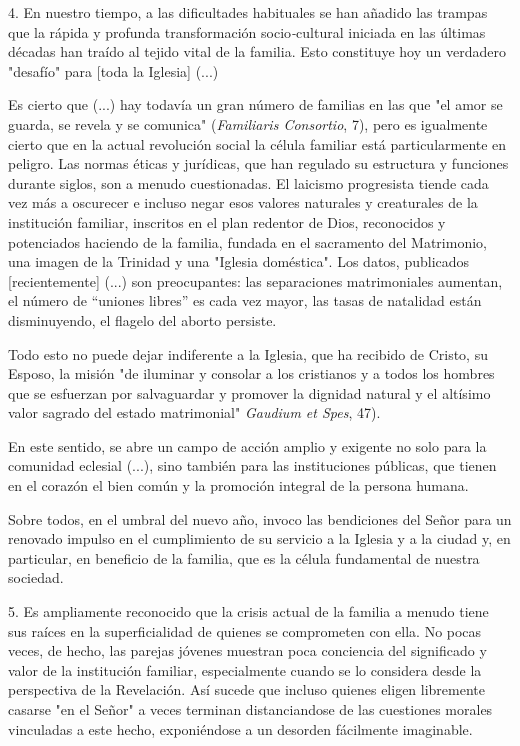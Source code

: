 4. En nuestro tiempo, a las dificultades habituales se han añadido las
trampas que la rápida y profunda transformación socio\emph{-}cultural
iniciada en las últimas décadas han traído al tejido vital de la
familia. Esto constituye hoy un verdadero "desafío" para {[}toda la
Iglesia{]} (...)

Es cierto que (...) hay todavía un gran número de familias en las que
"el amor se guarda, se revela y se comunica" (\emph{Familiaris
	Consortio}, 7), pero es igualmente cierto que en la actual revolución
social la célula familiar está particularmente en peligro. Las normas
éticas y jurídicas, que han regulado su estructura y funciones durante
siglos, son a menudo cuestionadas. El laicismo progresista tiende cada
vez más a oscurecer e incluso negar esos valores naturales y creaturales
de la institución familiar, inscritos en el plan redentor de Dios,
reconocidos y potenciados haciendo de la familia, fundada en el
sacramento del Matrimonio, una imagen de la Trinidad y una "Iglesia
doméstica". Los datos, publicados {[}recientemente{]} (...) son
preocupantes: las separaciones matrimoniales aumentan, el número de
``uniones libres'' es cada vez mayor, las tasas de natalidad están
disminuyendo, el flagelo del aborto persiste.

Todo esto no puede dejar indiferente a la Iglesia, que ha recibido de
Cristo, su Esposo, la misión "de iluminar y consolar a los cristianos y
a todos los hombres que se esfuerzan por salvaguardar y promover la
dignidad natural y el altísimo valor sagrado del estado matrimonial"
\emph{Gaudium et Spes}, 47).

En este sentido, se abre un campo de acción amplio y exigente no solo
para la comunidad eclesial (...), sino también para las instituciones
públicas, que tienen en el corazón el bien común y la promoción integral
de la persona humana.

Sobre todos, en el umbral del nuevo año, invoco las bendiciones del
Señor para un renovado impulso en el cumplimiento de su servicio a la
Iglesia y a la ciudad y, en particular, en beneficio de la familia, que
es la célula fundamental de nuestra sociedad.

5. Es ampliamente reconocido que la crisis actual de la familia a menudo
tiene sus raíces en la superficialidad de quienes se comprometen con
ella. No pocas veces, de hecho, las parejas jóvenes muestran poca
conciencia del significado y valor de la institución familiar,
especialmente cuando se lo considera desde la perspectiva de la
Revelación. Así sucede que incluso quienes eligen libremente casarse "en
el Señor" a veces terminan distanciandose de las cuestiones morales
vinculadas a este hecho, exponiéndose a un desorden fácilmente
imaginable.

